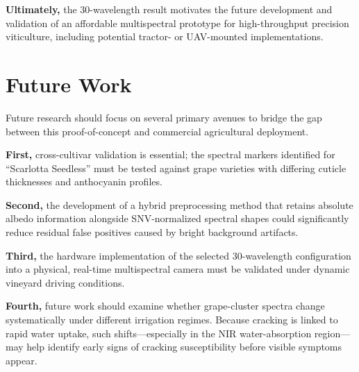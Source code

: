 
\medskip\noindent
\textbf{Ultimately,} the 30-wavelength result motivates the future development and validation of an affordable multispectral prototype for high-throughput precision viticulture, including potential tractor- or UAV-mounted implementations.

\newpage
\section{Future Work}
\label{sec:future_work}
\noindent
Future research should focus on several primary avenues to bridge the gap between this proof-of-concept and commercial agricultural deployment.

\medskip
\noindent
\textbf{First,} cross-cultivar validation is essential; the spectral markers identified for ``Scarlotta Seedless'' must be tested against grape varieties with differing cuticle thicknesses and anthocyanin profiles.

\medskip
\noindent
\textbf{Second,} the development of a hybrid preprocessing method that retains absolute albedo information alongside SNV-normalized spectral shapes could significantly reduce residual false positives caused by bright background artifacts.

\medskip
\noindent
\textbf{Third,} the hardware implementation of the selected 30-wavelength configuration into a physical, real-time multispectral camera must be validated under dynamic vineyard driving conditions.

\medskip
\noindent
\textbf{Fourth,} future work should examine whether grape-cluster spectra change systematically under different irrigation regimes. Because cracking is linked to rapid water uptake, such shifts---especially in the NIR water-absorption region---may help identify early signs of cracking susceptibility before visible symptoms appear.
    
